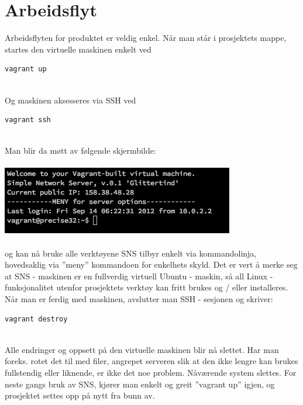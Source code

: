 \documentclass{article}
\begin{document}
\section{Arbeidsflyt}
Arbeidsflyten for produktet er veldig enkel. Når man står i prosjektets mappe, startes den virtuelle maskinen enkelt ved \\
\begin{lstlisting}
vagrant up
\end{lstlisting}
\\ 
Og maskinen aksesseres via SSH ved
\begin{lstlisting}
vagrant ssh
\end{lstlisting}
\\
Man blir da møtt av følgende skjermbilde: \\ \\
\includegraphics[scale = 0.7]{vagrantSSH.png}
\\ \\
og kan nå bruke alle verktøyene SNS tilbyr enkelt via kommandolinja, hovedsaklig via ''meny'' kommandoen for enkelhets skyld. Det er vert å merke seg at SNS - maskinen er en fullverdig virtuell Ubuntu - maskin, så all Linux - funksjonalitet utenfor prosjektets verktøy kan fritt brukes og / eller installeres. \\ 
Når man er ferdig med maskinen, avslutter man SSH - sesjonen og skriver: \\
\begin{lstlisting}
vagrant destroy
\end{lstlisting}
\\
Alle endringer og oppsett på den virtuelle maskinen blir nå slettet. Har man foreks. rotet det til med filer, angrepet serveren slik at den ikke lengre kan brukes fullstendig eller liknende, er ikke det noe problem. Nåværende system slettes. For neste gangs bruk av SNS, kjører man enkelt og greit ''vagrant up'' igjen, og prosjektet settes opp på nytt fra bunn av. 
\end{document}
